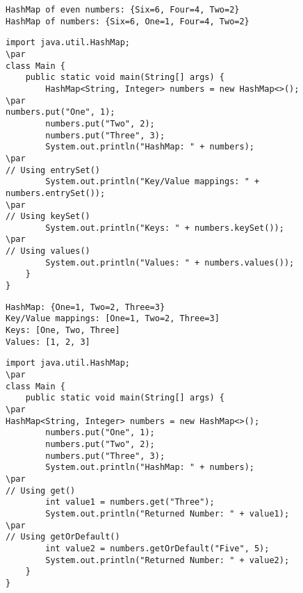 \documentclass{book}
\def\lthtmlcheckvsize{\ifdim\ht\sizebox<\vsize 
  \ifdim\wd\sizebox<\hsize\expandafter\hfill\fi \expandafter\vfill
  \else\expandafter\vss\fi}%
\begin{document}
{\newpage\clearpage
{}%
\begin{lstlisting}
HashMap of even numbers: {Six=6, Four=4, Two=2}
HashMap of numbers: {Six=6, One=1, Four=4, Two=2}
\end{lstlisting}%
\lthtmlfigureZ
\lthtmlcheckvsize\clearpage}

{\newpage\clearpage
{}%
\begin{lstlisting}
import java.util.HashMap;
\par
class Main {
    public static void main(String[] args) {
        HashMap<String, Integer> numbers = new HashMap<>();
\par
numbers.put("One", 1);
        numbers.put("Two", 2);
        numbers.put("Three", 3);
        System.out.println("HashMap: " + numbers);
\par
// Using entrySet()
        System.out.println("Key/Value mappings: " + numbers.entrySet());
\par
// Using keySet()
        System.out.println("Keys: " + numbers.keySet());
\par
// Using values()
        System.out.println("Values: " + numbers.values());
    }
}
\end{lstlisting}%
\lthtmlfigureZ
\lthtmlcheckvsize\clearpage}

{\newpage\clearpage
{}%
\begin{lstlisting}
HashMap: {One=1, Two=2, Three=3}
Key/Value mappings: [One=1, Two=2, Three=3]
Keys: [One, Two, Three]
Values: [1, 2, 3]
\end{lstlisting}%
\lthtmlfigureZ
\lthtmlcheckvsize\clearpage}

{\newpage\clearpage
{}%
\begin{lstlisting}
import java.util.HashMap;
\par
class Main {
    public static void main(String[] args) {
\par
HashMap<String, Integer> numbers = new HashMap<>();
        numbers.put("One", 1);
        numbers.put("Two", 2);
        numbers.put("Three", 3);
        System.out.println("HashMap: " + numbers);
\par
// Using get()
        int value1 = numbers.get("Three");
        System.out.println("Returned Number: " + value1);
\par
// Using getOrDefault()
        int value2 = numbers.getOrDefault("Five", 5);
        System.out.println("Returned Number: " + value2);
    }
}
\end{lstlisting}%
\lthtmlfigureZ
\lthtmlcheckvsize\clearpage}
\end{document}
